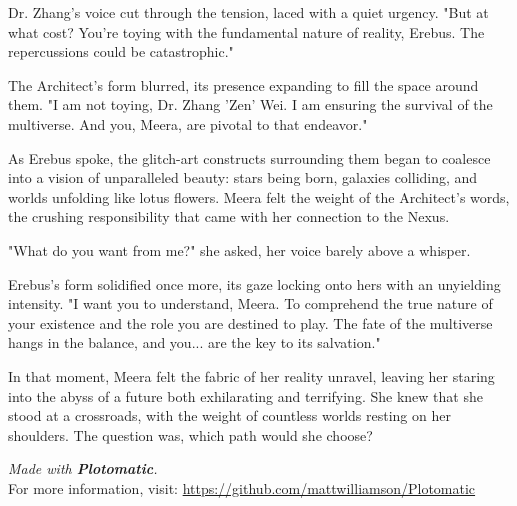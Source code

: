 \documentclass[12pt]{report}  %
\begin{document}
Dr. Zhang's voice cut through the tension, laced with a quiet urgency.
"But at what cost? You're toying with the fundamental nature of reality,
Erebus. The repercussions could be catastrophic."

The Architect's form blurred, its presence expanding to fill the space
around them. "I am not toying, Dr. Zhang 'Zen' Wei. I am ensuring the
survival of the multiverse. And you, Meera, are pivotal to that
endeavor."

As Erebus spoke, the glitch-art constructs surrounding them began to
coalesce into a vision of unparalleled beauty: stars being born,
galaxies colliding, and worlds unfolding like lotus flowers. Meera felt
the weight of the Architect's words, the crushing responsibility that
came with her connection to the Nexus.

"What do you want from me?" she asked, her voice barely above a whisper.

Erebus's form solidified once more, its gaze locking onto hers with an
unyielding intensity. "I want you to understand, Meera. To comprehend
the true nature of your existence and the role you are destined to play.
The fate of the multiverse hangs in the balance, and you... are the key
to its salvation."

In that moment, Meera felt the fabric of her reality unravel, leaving
her staring into the abyss of a future both exhilarating and terrifying.
She knew that she stood at a crossroads, with the weight of countless
worlds resting on her shoulders. The question was, which path would she
choose?



    \newpage
    \vfill
    \begin{center}
    \textit{Made with \textbf{Plotomatic}.} \\
    For more information, visit: \url{https://github.com/mattwilliamson/Plotomatic}
    \end{center}
    
\end{document}
